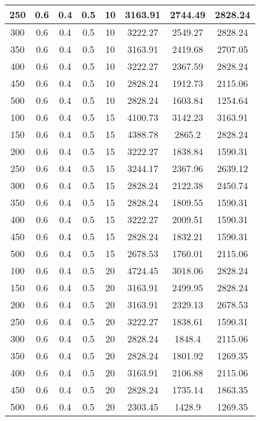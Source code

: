\documentclass[a4paper, 12pt]{extreport}
\begin{document}
\begin{itemize}
\begin{longtable}{|c|c|c|c|c|c|c|c|}
			250 & 0.6 & 0.4 & 0.5 & 10 & 3163.91 & 2744.49 & 2828.24 \\\hline
			300 & 0.6 & 0.4 & 0.5 & 10 & 3222.27 & 2549.27 & 2828.24 \\\hline
			350 & 0.6 & 0.4 & 0.5 & 10 & 3163.91 & 2419.68 & 2707.05 \\\hline
			400 & 0.6 & 0.4 & 0.5 & 10 & 3222.27 & 2367.59 & 2828.24 \\\hline
			450 & 0.6 & 0.4 & 0.5 & 10 & 2828.24 & 1912.73 & 2115.06 \\\hline
			500 & 0.6 & 0.4 & 0.5 & 10 & 2828.24 & 1603.84 & 1254.64 \\\hline
			100 & 0.6 & 0.4 & 0.5 & 15 & 4100.73 & 3142.23 & 3163.91 \\\hline
			150 & 0.6 & 0.4 & 0.5 & 15 & 4388.78 & 2865.2 & 2828.24 \\\hline
			200 & 0.6 & 0.4 & 0.5 & 15 & 3222.27 & 1838.84 & 1590.31 \\\hline
			250 & 0.6 & 0.4 & 0.5 & 15 & 3244.17 & 2367.96 & 2639.12 \\\hline
			300 & 0.6 & 0.4 & 0.5 & 15 & 2828.24 & 2122.38 & 2450.74 \\\hline
			350 & 0.6 & 0.4 & 0.5 & 15 & 2828.24 & 1809.55 & 1590.31 \\\hline
			400 & 0.6 & 0.4 & 0.5 & 15 & 3222.27 & 2009.51 & 1590.31 \\\hline
			450 & 0.6 & 0.4 & 0.5 & 15 & 2828.24 & 1832.21 & 1590.31 \\\hline
			500 & 0.6 & 0.4 & 0.5 & 15 & 2678.53 & 1760.01 & 2115.06 \\\hline
			100 & 0.6 & 0.4 & 0.5 & 20 & 4724.45 & 3018.06 & 2828.24 \\\hline
			150 & 0.6 & 0.4 & 0.5 & 20 & 3163.91 & 2499.95 & 2828.24 \\\hline
			200 & 0.6 & 0.4 & 0.5 & 20 & 3163.91 & 2329.13 & 2678.53 \\\hline
			250 & 0.6 & 0.4 & 0.5 & 20 & 3222.27 & 1838.61 & 1590.31 \\\hline
			300 & 0.6 & 0.4 & 0.5 & 20 & 2828.24 & 1848.4 & 2115.06 \\\hline
			350 & 0.6 & 0.4 & 0.5 & 20 & 2828.24 & 1801.92 & 1269.35 \\\hline
			400 & 0.6 & 0.4 & 0.5 & 20 & 3163.91 & 2106.88 & 2115.06 \\\hline
			450 & 0.6 & 0.4 & 0.5 & 20 & 2828.24 & 1735.14 & 1863.35 \\\hline
			500 & 0.6 & 0.4 & 0.5 & 20 & 2303.45 & 1428.9 & 1269.35 \\\hline

\end{longtable}
\end{itemize}
\end{document}
